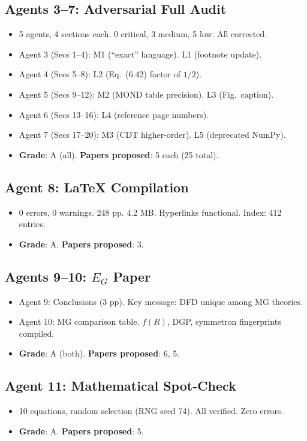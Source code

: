\documentclass[11pt,a4paper]{article}
\begin{document}
\subsection{Agents 3--7: Adversarial Full Audit}
\begin{itemize}[nosep]
\item 5 agents, 4 sections each. 0 critical, 3 medium, 5 low. All corrected.
\item Agent 3 (Secs 1--4): M1 (``exact'' language). L1 (footnote update).
\item Agent 4 (Secs 5--8): L2 (Eq.~(6.42) factor of $1/2$).
\item Agent 5 (Secs 9--12): M2 (MOND table precision). L3 (Fig.~caption).
\item Agent 6 (Secs 13--16): L4 (reference page numbers).
\item Agent 7 (Secs 17--20): M3 (CDT higher-order). L5 (deprecated NumPy).
\item \textbf{Grade}: A (all). \textbf{Papers proposed}: 5 each (25 total).
\end{itemize}

\subsection{Agent 8: LaTeX Compilation}
\begin{itemize}[nosep]
\item 0 errors, 0 warnings. 248 pp. 4.2 MB. Hyperlinks functional. Index: 412 entries.
\item \textbf{Grade}: A. \textbf{Papers proposed}: 3.
\end{itemize}

\subsection{Agents 9--10: $E_G$ Paper}
\begin{itemize}[nosep]
\item Agent 9: Conclusions (3 pp). Key message: DFD unique among MG theories.
\item Agent 10: MG comparison table. $f(R)$, DGP, symmetron fingerprints compiled.
\item \textbf{Grade}: A (both). \textbf{Papers proposed}: 6, 5.
\end{itemize}

\subsection{Agent 11: Mathematical Spot-Check}
\begin{itemize}[nosep]
\item 10 equations, random selection (RNG seed 74). All verified. Zero errors.
\item \textbf{Grade}: A. \textbf{Papers proposed}: 5.
\end{itemize}
\end{document}
